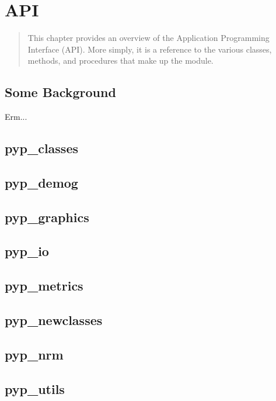 \chapter{API}
\label{cha:api}

\begin{quote} 
   This chapter provides an overview of the \PYPEDAL{} Application Programming Interface (API).  More simply, it is a reference to the various classes, methods, and procedures that make up the \PYPEDAL{} module.
\end{quote}

\section{Some Background}
Erm...

\section{pyp\_classes}


\section{pyp\_demog}


\section{pyp\_graphics}


\section{pyp\_io}


\section{pyp\_metrics}


\section{pyp\_newclasses}


\section{pyp\_nrm}


\section{pyp\_utils}
